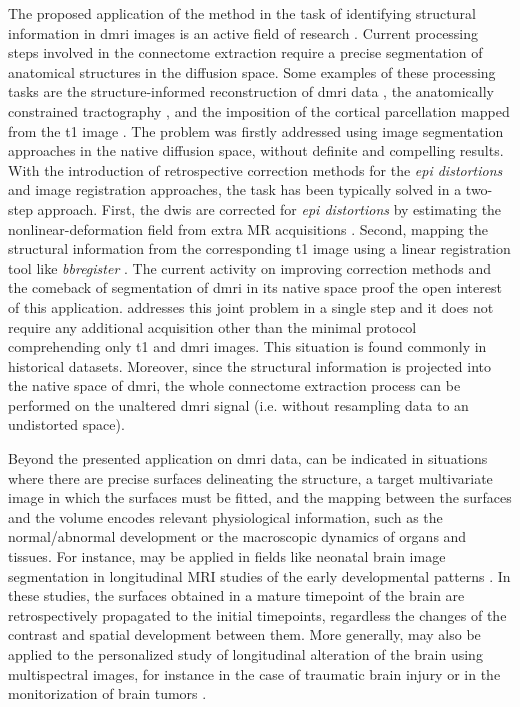 The proposed application of the method in the task of identifying structural information
  in \gls*{dmri} images is an active field of research \citep{jeurissen_tissuetype_2015}.
Current processing steps involved in the connectome extraction require a precise segmentation
  of anatomical structures in the diffusion space.
Some examples of these processing tasks are the structure-informed reconstruction of \gls*{dmri}
  data \citep{jeurissen_multitissue_2014,daducci_accelerated_2015}, the anatomically constrained
  tractography \citep{smith_anatomicallyconstrained_2012}, and the imposition of the cortical
  parcellation mapped from the \gls*{t1} image \citep{hagmann_mapping_2008}.
The problem was firstly addressed using image segmentation approaches in the native diffusion
  space, without definite and compelling results.
With the introduction of retrospective correction methods for the \emph{\gls*{epi} distortions}
  and image registration approaches, the task has been typically solved in a two-step approach.
First, the \glspl*{dwi} are corrected for \emph{\gls*{epi} distortions} by estimating
  the nonlinear-deformation field from extra MR acquisitions
  \citep{jezzard_correction_1995,chiou_simple_2000,cordes_geometric_2000,kybic_unwarping_2000}.
Second, mapping the structural information from the corresponding \gls*{t1} image
  using a linear registration tool like \emph{bbregister} \citep{greve_accurate_2009}.
The current activity on improving correction methods \citep{irfanoglu_drbuddi_2015} and
  the comeback of segmentation of \gls*{dmri} in its native space
  \citep{jeurissen_tissuetype_2015} proof the open interest of this application.
\Regseg{} addresses this joint problem in a single step and it does not require any additional
  acquisition other than the minimal protocol comprehending only \gls*{t1} and \gls*{dmri} images.
This situation is found commonly in historical datasets.
Moreover, since the structural information is projected into the native space of \gls*{dmri},
  the whole connectome extraction process can be performed on the unaltered \gls*{dmri}
  signal (i.e. without resampling data to an undistorted space).

Beyond the presented application on \gls*{dmri} data, \regseg{} can be indicated in situations
  where there are precise surfaces delineating the structure, a target multivariate
  image in which the surfaces must be fitted, and the mapping between the surfaces and
  the volume encodes relevant physiological information, such as the normal/abnormal
  development or the macroscopic dynamics of organs and tissues.
For instance, \regseg{} may be applied in fields like neonatal brain image segmentation
  in longitudinal MRI studies of the early developmental patterns \citep{shi_neonatal_2010}.
In these studies, the surfaces obtained in a mature timepoint of the brain are retrospectively
  propagated to the initial timepoints, regardless the changes of the contrast and spatial
  development between them.
More generally, \regseg{} may also be applied to the personalized study of longitudinal alteration
  of the brain using multispectral images, for instance in the case of traumatic brain
  injury \citep{irimia_structural_2014} or in the monitorization of brain tumors
  \citep{weizman_semiautomatic_2014}.